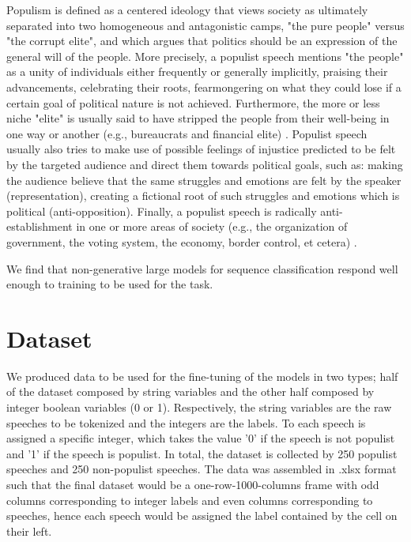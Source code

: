 \documentclass[11pt,twocolumn,letterpaper]{article}
\begin{document}
Populism is defined as a centered ideology that views society as ultimately separated into two homogeneous and antagonistic camps, "the pure people" versus "the corrupt elite", and which argues that politics should be an expression of the general will of the people. More precisely, a populist speech mentions "the people" as a unity of individuals either frequently or generally implicitly, praising their advancements, celebrating their roots, fearmongering on what they could lose if a certain goal of political nature is not achieved. Furthermore, the more or less niche "elite" is usually said to have stripped the people from their well-being in one way or another (e.g., bureaucrats and financial elite) \cite{abts2016populism}. Populist speech usually also tries to make use of possible feelings of injustice predicted to be felt by the targeted audience and direct them towards political goals, such as: making the audience believe that the same struggles and emotions are felt by the speaker (representation), creating a fictional root of such struggles and emotions which is political (anti-opposition). Finally, a populist speech is radically anti-establishment in one or more areas of society (e.g., the organization of government, the voting system, the economy, border control, et cetera) \cite{mudde2017populism}.


We find that non-generative large models for sequence classification respond well enough to training to be used for the task.


\section{Dataset}

We produced data to be used for the fine-tuning of the models in two types; half of the dataset composed by string variables and the other half composed by integer boolean variables (0 or 1). Respectively, the string variables are the raw speeches to be tokenized and the integers are the labels. To each speech is assigned a specific integer, which takes the value '0' if the speech is not populist and '1' if the speech is populist. In total, the dataset is collected by 250 populist speeches and 250 non-populist speeches.
The data was assembled in .xlsx format such that the final dataset would be a one-row-1000-columns frame with odd columns corresponding to integer labels and even columns corresponding to speeches, hence each speech would be assigned the label contained by the cell on their left.
\end{document}
